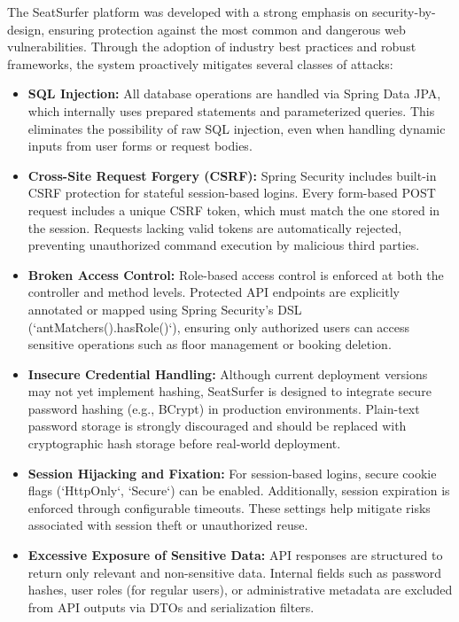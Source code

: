 \documentclass[12pt,a4paper]{report} %
\begin{document}
The SeatSurfer platform was developed with a strong emphasis on security-by-design, ensuring protection against the most common and dangerous web vulnerabilities. Through the adoption of industry best practices and robust frameworks, the system proactively mitigates several classes of attacks:

\begin{itemize}
\item \textbf{SQL Injection:}
All database operations are handled via Spring Data JPA, which internally uses prepared statements and parameterized queries. This eliminates the possibility of raw SQL injection, even when handling dynamic inputs from user forms or request bodies.
\item \textbf{Cross-Site Request Forgery (CSRF):}  
Spring Security includes built-in CSRF protection for stateful session-based logins. Every form-based POST request includes a unique CSRF token, which must match the one stored in the session. Requests lacking valid tokens are automatically rejected, preventing unauthorized command execution by malicious third parties.

\item \textbf{Broken Access Control:}  
Role-based access control is enforced at both the controller and method levels. Protected API endpoints are explicitly annotated or mapped using Spring Security's DSL (`antMatchers().hasRole()`), ensuring only authorized users can access sensitive operations such as floor management or booking deletion.

\item \textbf{Insecure Credential Handling:}  
Although current deployment versions may not yet implement hashing, SeatSurfer is designed to integrate secure password hashing (e.g., BCrypt) in production environments. Plain-text password storage is strongly discouraged and should be replaced with cryptographic hash storage before real-world deployment.

\item \textbf{Session Hijacking and Fixation:}  
For session-based logins, secure cookie flags (`HttpOnly`, `Secure`) can be enabled. Additionally, session expiration is enforced through configurable timeouts. These settings help mitigate risks associated with session theft or unauthorized reuse.

\item \textbf{Excessive Exposure of Sensitive Data:}  
API responses are structured to return only relevant and non-sensitive data. Internal fields such as password hashes, user roles (for regular users), or administrative metadata are excluded from API outputs via DTOs and serialization filters.
\end{itemize}
\end{document}

